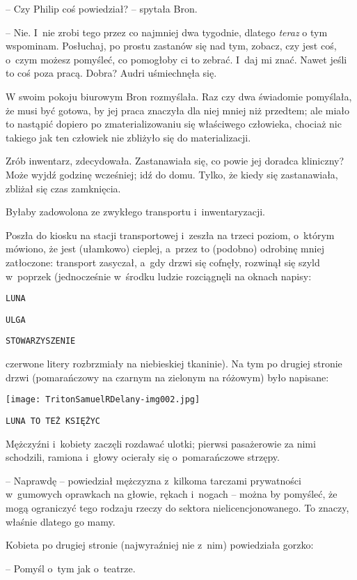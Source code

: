 \documentclass[oneside,polish,11pt,rmheadings]{mwbk}
\begin{document}
-- Czy Philip coś powiedział? -- spytała Bron. 

-- Nie. I~nie zrobi tego przez co najmniej dwa tygodnie, dlatego \textit{teraz }o tym wspominam. Posłuchaj, po prostu zastanów się nad tym, zobacz, czy jest coś, o~czym możesz pomyśleć, co pomogłoby ci to zebrać. I~daj mi znać. Nawet jeśli to coś poza pracą. Dobra? Audri uśmiechnęła się. 

W swoim pokoju biurowym Bron rozmyślała. Raz czy dwa świadomie pomyślała, że musi być gotowa, by jej praca znaczyła dla niej mniej niż przedtem; ale miało to nastąpić dopiero po zmaterializowaniu się właściwego człowieka, chociaż nic takiego jak ten człowiek nie zbliżyło się do materializacji. 

Zrób inwentarz, zdecydowała. Zastanawiała się, co powie jej doradca kliniczny? Może wyjdź godzinę wcześniej; idź do domu. Tylko, że kiedy się zastanawiała, zbliżał się czas zamknięcia. 

Byłaby zadowolona ze zwykłego transportu i~inwentaryzacji. 

Poszła do kiosku na stacji transportowej i~zeszła na trzeci poziom, o~którym mówiono, że jest (ułamkowo) cieplej, a~przez to (podobno) odrobinę mniej zatłoczone: transport zasyczał, a~gdy drzwi się cofnęły, rozwinął się szyld w~poprzek (jednocześnie w~środku ludzie rozciągnęli na oknach napisy: 

\noindent \texttt{LUNA}

\noindent \texttt{ULGA} 

\noindent \texttt{STOWARZYSZENIE}

czerwone litery rozbrzmiały na niebieskiej tkaninie). Na tym po drugiej stronie drzwi (pomarańczowy na czarnym na zielonym na różowym) było napisane: 


\texttt{[image: TritonSamuelRDelany-img002.jpg]} 

\noindent \texttt{LUNA TO TEŻ KSIĘŻYC}

Mężczyźni i~kobiety zaczęli rozdawać ulotki; pierwsi pasażerowie za nimi schodzili, ramiona i~głowy ocierały się o~pomarańczowe strzępy. 

-- Naprawdę -- powiedział mężczyzna z~kilkoma tarczami prywatności w~gumowych oprawkach na głowie, rękach i~nogach -- można by pomyśleć, że mogą ograniczyć tego rodzaju rzeczy do sektora nielicencjonowanego. To znaczy, właśnie dlatego go mamy. 

Kobieta po drugiej stronie (najwyraźniej nie z~nim) powiedziała gorzko: 

-- Pomyśl o~tym jak o~teatrze. 
\end{document}

